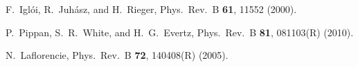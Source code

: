 \documentclass[twocolumn,superscriptaddress,prb,10pt]{revtex4-1}
\begin{document}
\begin{thebibliography}{99}


F.~Igl\'oi, R.~Juh\'asz, and H.~Rieger, Phys.\ Rev.\ B {\bf 61}, 11552 (2000).

P.~Pippan, S.~R.~White, and H.~G.~Evertz, Phys.\ Rev.\ B {\bf 81}, 081103(R) 
(2010). 

N.~Laflorencie, Phys.\ Rev.\ B {\bf 72}, 140408(R) (2005). 

\end{thebibliography}
\end{document}
